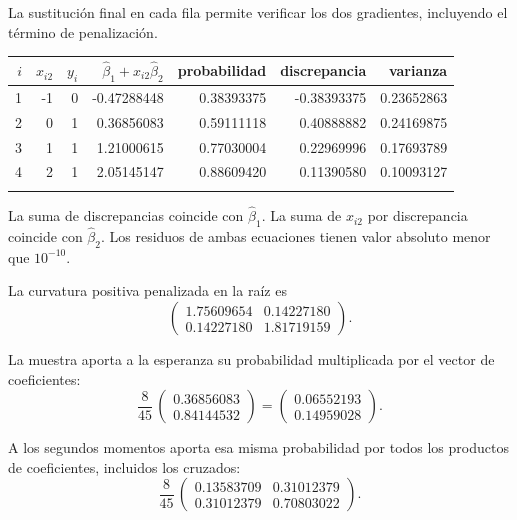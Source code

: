 \documentclass[11pt,a4paper]{article}
\begin{document}
La sustitución final en cada fila permite verificar
los dos gradientes, incluyendo el término de penalización.
\begin{center}\scriptsize
\begin{tabular}{rrrrrrr}\toprule
\(i\)&\(x_{i2}\)&\(y_i\)&\(\widehat\beta_1+x_{i2}\widehat\beta_2\)&probabilidad&discrepancia&varianza\\\midrule
1&-1&0&-0.47288448&0.38393375&-0.38393375&0.23652863\\
2&0&1&0.36856083&0.59111118&0.40888882&0.24169875\\
3&1&1&1.21000615&0.77030004&0.22969996&0.17693789\\
4&2&1&2.05145147&0.88609420&0.11390580&0.10093127\\
\\\bottomrule\end{tabular}\end{center}
La suma de discrepancias coincide con \(\widehat\beta_1\).
La suma de \(x_{i2}\) por discrepancia coincide con
\(\widehat\beta_2\). Los residuos de ambas ecuaciones
tienen valor absoluto menor que \(10^{-10}\).

La curvatura positiva penalizada en la raíz es
\[
\begin{pmatrix}1.75609654&0.14227180\\0.14227180&1.81719159\end{pmatrix}.
\]

La muestra aporta a la esperanza su probabilidad
multiplicada por el vector de coeficientes:
\[
\frac{8}{45}\,\begin{pmatrix}0.36856083\\0.84144532\end{pmatrix}=\begin{pmatrix}0.06552193\\0.14959028\end{pmatrix}.
\]

A los segundos momentos aporta esa misma probabilidad
por todos los productos de coeficientes, incluidos los cruzados:
\[
\frac{8}{45}\,\begin{pmatrix}0.13583709&0.31012379\\0.31012379&0.70803022\end{pmatrix}.
\]
\end{document}
